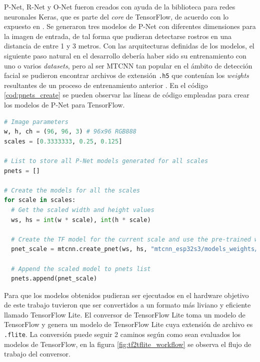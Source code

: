 P-Net, R-Net y O-Net fueron creados con ayuda de la biblioteca para redes neuronales Keras, que es parte del \textit{core} de TensorFlow, de acuerdo con lo expuesto en \cite{mtcnn_info}. Se generaron tres modelos de P-Net con diferentes dimensiones para la imagen de entrada, de tal forma que pudieran detectarse rostros en una distancia de entre 1 y 3 metros. Con las arquitecturas definidas de los modelos, el siguiente paso natural en el desarrollo debería haber sido su entrenamiento con uno o varios \textit{datasets}, pero al ser MTCNN tan popular en el ámbito de detección facial se pudieron encontrar archivos de extensión \texttt{.h5} que contenían los \textit{weights} resultantes de un proceso de entrenamiento anterior \cite{weigths_repo}. En el código \ref{cod:pnets_create} se pueden observar las líneas de código empleadas para crear los modelos de P-Net para TensorFlow.

\newpage

\begin{lstlisting}[language=Python, label=cod:pnets_create, caption=Código para crear los modelos de P-Net con TensorFlow.]
# Image parameters
w, h, ch = (96, 96, 3) # 96x96 RGB888
scales = [0.3333333, 0.25, 0.125]

# List to store all P-Net models generated for all scales
pnets = []

# Create the models for all the scales
for scale in scales:
  # Get the scaled width and height values
  ws, hs = int(w * scale), int(h * scale)

  # Create the TF model for the current scale and use the pre-trained weigths
  pnet_scale = mtcnn.create_pnet(ws, hs, "mtcnn_esp32s3/models_weights/12net.h5")

  # Append the scaled model to pnets list
  pnets.append(pnet_scale)
\end{lstlisting}

Para que los modelos obtenidos pudieran ser ejecutados en el hardware objetivo de este trabajo tuvieron que ser convertidos a un formato más liviano y eficiente llamado TensorFlow Lite. El conversor de TensorFlow Lite toma un modelo de TensorFlow y genera un modelo de TensorFlow Lite cuya extensión de archivo es \texttt{.flite}. La conversión puede seguir 2 caminos según como sean evaluados los modelos de TensorFlow, en la figura \ref{fig:tf2tflite_workflow} se observa el flujo de trabajo del conversor.

